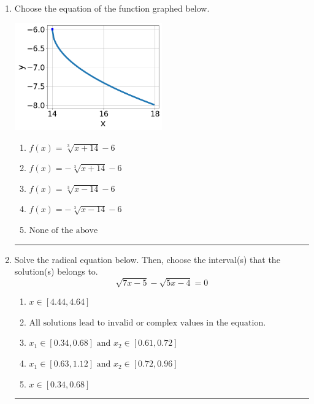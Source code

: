 \documentclass[14pt]{extbook}
\newcommand{\litem}[1]{\item#1\hspace*{-1cm}\rule{\textwidth}{0.4pt}}
\begin{document}
\begin{enumerate}
{\begin{enumerate}[label=\Alph*.]
\end{enumerate} }
\litem{
Choose the equation of the function graphed below.
\begin{center}
    \includegraphics[width=0.5\textwidth]{../Figures/radicalGraphToEquationA.png}
\end{center}
\begin{enumerate}[label=\Alph*.]
\item \( f(x) = \sqrt[3]{x + 14} - 6 \)
\item \( f(x) = - \sqrt[3]{x + 14} - 6 \)
\item \( f(x) = \sqrt[3]{x - 14} - 6 \)
\item \( f(x) = - \sqrt[3]{x - 14} - 6 \)
\item \( \text{None of the above} \)

\end{enumerate} }
\litem{
Solve the radical equation below. Then, choose the interval(s) that the solution(s) belongs to.\[ \sqrt{7 x - 5} - \sqrt{5 x - 4} = 0 \]\begin{enumerate}[label=\Alph*.]
\item \( x \in [4.44,4.64] \)
\item \( \text{All solutions lead to invalid or complex values in the equation.} \)
\item \( x_1 \in [0.34, 0.68] \text{ and } x_2 \in [0.61,0.72] \)
\item \( x_1 \in [0.63, 1.12] \text{ and } x_2 \in [0.72,0.96] \)
\item \( x \in [0.34,0.68] \)


\end{enumerate}}
\end{enumerate}
\end{document}
